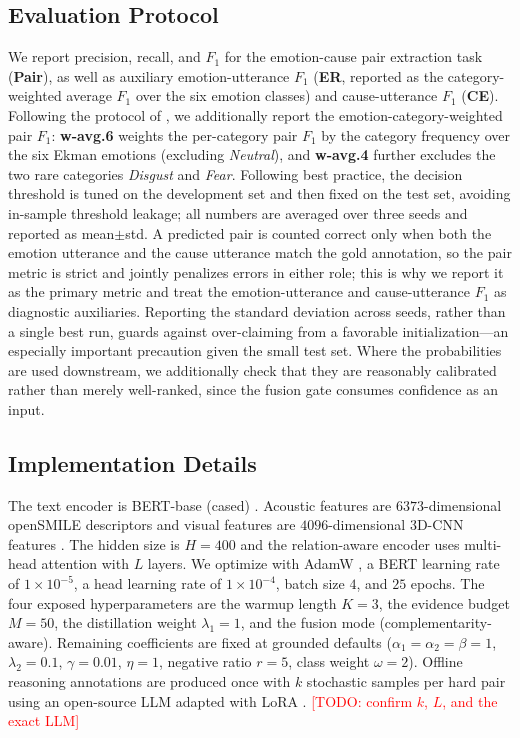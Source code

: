 \documentclass[journal]{IEEEtran}
\newcommand{\todo}[1]{\textcolor{red}{[TODO: #1]}}
\begin{document}
\subsection{Evaluation Protocol}
We report precision, recall, and $F_1$ for the emotion-cause pair extraction task
(\textbf{Pair}), as well as auxiliary emotion-utterance $F_1$ (\textbf{ER}, reported as the
category-weighted average $F_1$ over the six emotion classes) and cause-utterance $F_1$
(\textbf{CE}). Following the protocol of \cite{wang2023mecpe,wu2025decdebate}, we additionally
report the emotion-category-weighted pair $F_1$: \textbf{w-avg.6} weights the per-category
pair $F_1$ by the category frequency over the six Ekman emotions (excluding \emph{Neutral}),
and \textbf{w-avg.4} further excludes the two rare categories \emph{Disgust} and \emph{Fear}.
Following best practice, the decision threshold is
tuned on the development set and then fixed on the test set, avoiding in-sample threshold
leakage; all numbers are averaged over three seeds and reported as mean$\pm$std. A predicted
pair is counted correct only when both the emotion utterance and the cause utterance match
the gold annotation, so the pair metric is strict and jointly penalizes errors in either
role; this is why we report it as the primary metric and treat the emotion-utterance and
cause-utterance $F_1$ as diagnostic auxiliaries. Reporting the standard deviation across
seeds, rather than a single best run, guards against over-claiming from a favorable
initialization---an especially important precaution given the small test set. Where the
probabilities are used downstream, we additionally check that they are reasonably
calibrated \cite{guo2017calibration} rather than merely well-ranked, since the fusion gate
consumes confidence as an input.

\subsection{Implementation Details}
The text encoder is BERT-base (cased) \cite{devlin2019bert}. Acoustic features are
$6373$-dimensional openSMILE descriptors \cite{eyben2010opensmile} and visual features are
$4096$-dimensional 3D-CNN features \cite{tran2015c3d}. The hidden size is $H=400$ and the
relation-aware encoder uses multi-head attention with $L$ layers. We optimize with AdamW
\cite{loshchilov2019adamw}, a BERT learning rate of $1\!\times\!10^{-5}$, a head learning
rate of $1\!\times\!10^{-4}$, batch size $4$, and $25$ epochs. The four exposed hyperparameters
are the warmup length $K\!=\!3$, the evidence budget $M\!=\!50$, the distillation weight
$\lambda_1\!=\!1$, and the fusion mode (complementarity-aware). Remaining coefficients are
fixed at grounded defaults ($\alpha_1\!=\!\alpha_2\!=\!\beta\!=\!1$, $\lambda_2\!=\!0.1$,
$\gamma\!=\!0.01$, $\eta\!=\!1$, negative ratio $r\!=\!5$, class weight $\omega\!=\!2$).
Offline reasoning annotations are produced once with $k$ stochastic samples per hard pair
using an open-source LLM \cite{qwen2025} adapted with LoRA \cite{hu2021lora}. \todo{confirm
$k$, $L$, and the exact LLM}
\end{document}
